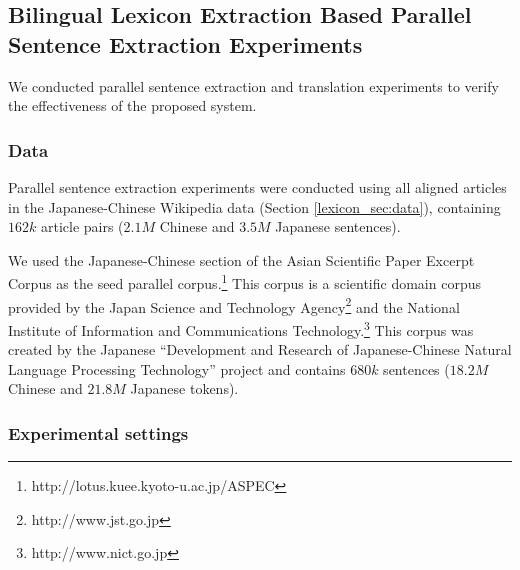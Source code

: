 \documentclass[english]{jnlp_1.4}
\begin{document}
\subsection{Bilingual Lexicon Extraction Based Parallel Sentence Extraction Experiments}
\label{sentence_sec:experiments}

We conducted parallel sentence extraction and translation experiments to verify the effectiveness of the proposed system.


\subsubsection{Data}
\label{sentence_sec:data}

Parallel sentence extraction experiments were conducted using all aligned articles in the Japanese-Chinese 
Wikipedia data (Section \ref{lexicon_sec:data}), containing $162k$ article pairs ($2.1M$ Chinese and $3.5M$ 
Japanese sentences).

We used the Japanese-Chinese section of the Asian Scientific Paper Excerpt Corpus as the seed 
parallel corpus.\footnote{http://lotus.kuee.kyoto-u.ac.jp/ASPEC} 
This corpus is a scientific domain corpus provided by the Japan Science and Technology 
Agency\footnote{http://www.jst.go.jp} and the National Institute of Information and Communications 
Technology.\footnote{http://www.nict.go.jp} This corpus was created by the
Japanese ``Development and Research of Japanese-Chinese Natural
Language Processing Technology'' project and contains $680k$ sentences ($18.2M$
Chinese and $21.8M$ Japanese tokens).


\subsubsection{Experimental settings}
\end{document}

